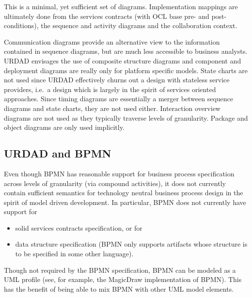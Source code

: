 This is a minimal, yet sufficient set of diagrams. Implementation mappings are ultimately done from the services contracts (with OCL
base pre- and post-conditions), the sequence and activity diagrams and the collaboration
context.

Communication diagrams provide an alternative view to the information contained in sequence diagrams, but are much less accessible to business analysts.
URDAD envisages the use of composite structure diagrams and component and deployment diagrams are really only for platform specific models. State charts are not used since URDAD effectively churns out a design with stateless service providers, i.e.\ a design which is largely in the spirit of services oriented approaches. Since timing diagrams are essentially a merger between
sequence diagrams and state charts, they are not used either. Interaction overview diagrams are not used as they typically traverse levels of granularity. Package and object diagrams are only
used implicitly.


\subsection{URDAD and BPMN}

Even though BPMN has reasonable support for business process specification
across levels of granularity (via compound activities), it does not currently
contain sufficient semantics for technology neutral business process design in
the spirit of model driven development. In particular, BPMN does not currently
have support for

\begin{itemize}
  \item solid services contracts specification, or for

  \item data structure specification (BPMN only supports artifacts whose
	structure is to be specified in some other language).
\end{itemize}

Though not required by the BPMN specification, BPMN can be modeled as a UML profile
(see, for example, the MagicDraw implementation of BPMN).
This has the benefit of being able to mix BPMN with other UML model elements.